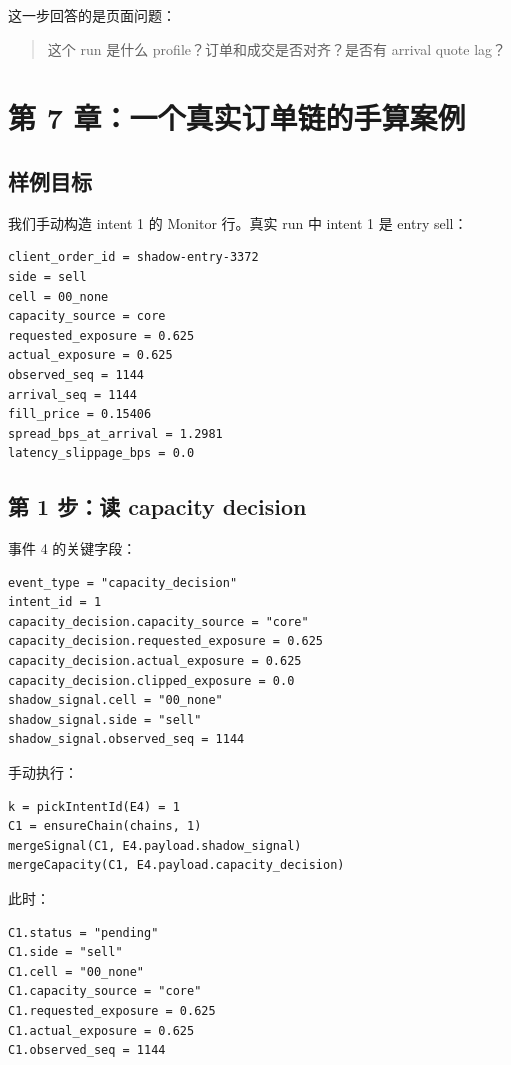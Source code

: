 \documentclass[11pt,a4paper]{ctexart}
\begin{document}
这一步回答的是页面问题：

\begin{quote}
这个 run 是什么 profile？订单和成交是否对齐？是否有 arrival quote lag？
\end{quote}

\section{第 7 章：一个真实订单链的手算案例}

\subsection{样例目标}

我们手动构造 intent 1 的 Monitor 行。真实 run 中 intent 1 是 entry sell：

\begin{lstlisting}
client_order_id = shadow-entry-3372
side = sell
cell = 00_none
capacity_source = core
requested_exposure = 0.625
actual_exposure = 0.625
observed_seq = 1144
arrival_seq = 1144
fill_price = 0.15406
spread_bps_at_arrival = 1.2981
latency_slippage_bps = 0.0
\end{lstlisting}

\subsection{第 1 步：读 capacity decision}

事件 4 的关键字段：

\begin{lstlisting}
event_type = "capacity_decision"
intent_id = 1
capacity_decision.capacity_source = "core"
capacity_decision.requested_exposure = 0.625
capacity_decision.actual_exposure = 0.625
capacity_decision.clipped_exposure = 0.0
shadow_signal.cell = "00_none"
shadow_signal.side = "sell"
shadow_signal.observed_seq = 1144
\end{lstlisting}

手动执行：

\begin{lstlisting}
k = pickIntentId(E4) = 1
C1 = ensureChain(chains, 1)
mergeSignal(C1, E4.payload.shadow_signal)
mergeCapacity(C1, E4.payload.capacity_decision)
\end{lstlisting}

此时：

\begin{lstlisting}
C1.status = "pending"
C1.side = "sell"
C1.cell = "00_none"
C1.capacity_source = "core"
C1.requested_exposure = 0.625
C1.actual_exposure = 0.625
C1.observed_seq = 1144
\end{lstlisting}
\end{document}
